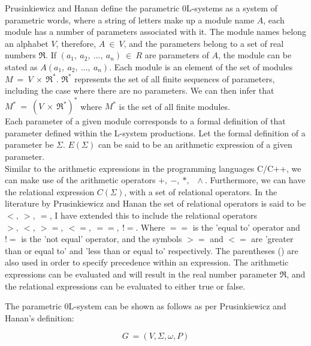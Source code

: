 \begin{flushleft}

Prusinkiewicz and Hanan define the parametric 0L-systems as a system of parametric words, where a string of letters make up a module name $A$, each module has a number of parameters associated with it. The module names belong an alphabet $V$, therefore, $A~ \in~ V$, and the parameters belong to a set of real numbers $\Re$. If $(a_1,~ a_2,~ ...,~ a_n)~ \in~ R$ are parameters of $A$, the module can be stated as $A(a_1,~ a_2,~ ...,~ a_n)$. Each module is an element of the set of modules $M~ =~ V~ \times~ \Re^*$. $\Re^*$ represents the set of all finite sequences of parameters, including the case where there are no parameters. We can then infer that $M^*~ =~ (V~ \times~ \Re^*)^*$ where $M^*$ is the set of all finite modules. \\
Each parameter of a given module corresponds to a formal definition of that parameter defined within the L-system productions. Let the formal definition of a parameter be $\Sigma$. $ E(\Sigma) $ can be said to be an arithmetic expression of a given parameter.\\ Similar to the arithmetic expressions in the programming languages C/C++, we can make use of the arithmetic operators $ +,~ -,~ *,~ \,~ \wedge{}$. Furthermore, we can have the relational expression $C(\Sigma)$, with a set of relational operators. In the literature by Prusinkiewicz and Hanan the set of relational operators is said to be $<,~ >,~ =$, I have extended this to include the relational operators $>,~ <,~ >=,~ <=,~ ==,~ !=$. Where $==$ is the 'equal to' operator and $!=$ is the 'not equal' operator, and the symbols $>=$ and $<=$ are 'greater than or equal to' and 'less than or equal to' respectively. The parentheses () are also used in order to specify precedence within an expression. The arithmetic expressions can be evaluated and will result in the real number parameter $\Re $, and the relational expressions can be evaluated to either true or false. \\

\vspace{5mm}

The parametric 0L-system can be shown as follows as per Prusinkiewicz and Hanan's definition:\\

\vspace{5mm}

\begin{equation}
G~ = (V, \Sigma, \omega, P)
\end{equation}
\vspace{5mm}


\end{flushleft}
